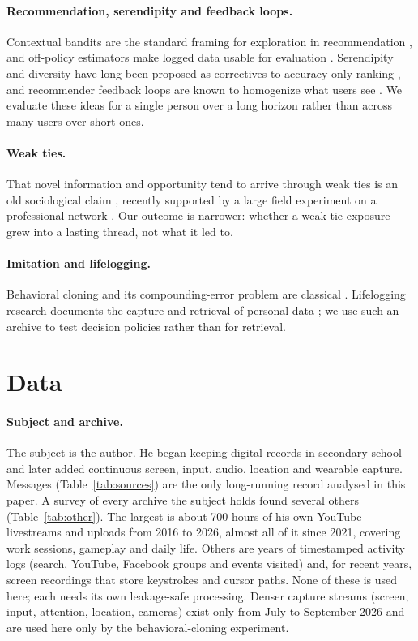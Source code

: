 \documentclass[11pt]{article}
\begin{document}
\paragraph{Recommendation, serendipity and feedback loops.} Contextual bandits are the standard framing for exploration in recommendation \citep{li2010contextual}, and off-policy estimators make logged data usable for evaluation \citep{li2011unbiased,swaminathan2015counterfactual}. Serendipity and diversity have long been proposed as correctives to accuracy-only ranking \citep{ziegler2005improving,kotkov2016survey}, and recommender feedback loops are known to homogenize what users see \citep{chaney2018algorithmic}. We evaluate these ideas for a single person over a long horizon rather than across many users over short ones.

\paragraph{Weak ties.} That novel information and opportunity tend to arrive through weak ties is an old sociological claim \citep{granovetter1973strength}, recently supported by a large field experiment on a professional network \citep{rajkumar2022causal}. Our outcome is narrower: whether a weak-tie exposure grew into a lasting thread, not what it led to.

\paragraph{Imitation and lifelogging.} Behavioral cloning and its compounding-error problem are classical \citep{pomerleau1991efficient,ross2011reduction}. Lifelogging research documents the capture and retrieval of personal data \citep{gurrin2014lifelogging}; we use such an archive to test decision policies rather than for retrieval.

\section{Data}
\label{sec:data}

\paragraph{Subject and archive.} The subject is the author. He began keeping digital records in secondary school and later added continuous screen, input, audio, location and wearable capture. Messages (Table~\ref{tab:sources}) are the only long-running record analysed in this paper. A survey of every archive the subject holds found several others (Table~\ref{tab:other}). The largest is about 700 hours of his own YouTube livestreams and uploads from 2016 to 2026, almost all of it since 2021, covering work sessions, gameplay and daily life. Others are years of timestamped activity logs (search, YouTube, Facebook groups and events visited) and, for recent years, screen recordings that store keystrokes and cursor paths. None of these is used here; each needs its own leakage-safe processing. Denser capture streams (screen, input, attention, location, cameras) exist only from July to September 2026 and are used here only by the behavioral-cloning experiment.
\end{document}
